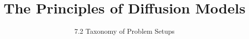 ﻿%

\graphicspath{{../images/}}
\title{The Principles of Diffusion Models}
\subtitle{7.2 Taxonomy of Problem Setups}


\begin{frame}
    \titlepage
\end{frame}



